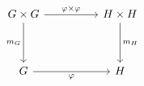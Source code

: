 \[\begin{tikzcd}
	{G \times G} && {H \times H} \\
	\\
	G && H
	\arrow["{\varphi \times \varphi}", from=1-1, to=1-3]
	\arrow["\varphi"', from=3-1, to=3-3]
	\arrow["{m_{G}}"', from=1-1, to=3-1]
	\arrow["{m_{H}}", from=1-3, to=3-3]
\end{tikzcd}\]